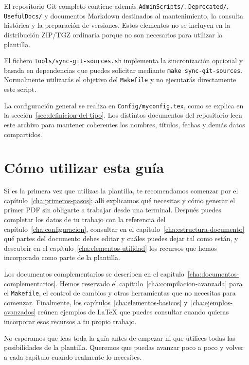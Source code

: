 El repositorio Git completo contiene además \texttt{AdminScripts/}, \texttt{Deprecated/}, \texttt{UsefulDocs/} y documentos Markdown destinados al mantenimiento, la consulta histórica y la preparación de versiones. Estos elementos no se incluyen en la distribución ZIP/TGZ ordinaria porque no son necesarios para utilizar la plantilla.

El fichero \texttt{Tools/sync-git-sources.sh} implementa la sincronización opcional y basada en dependencias que puedes solicitar mediante \texttt{make sync-git-sources}. Normalmente utilizarás el objetivo del \texttt{Makefile} y no ejecutarás directamente este script.

La configuración general se realiza en \texttt{Config/myconfig.tex}, como se explica en la sección~\ref{sec:definicion-del-tipo}. Los distintos documentos del repositorio leen este archivo para mantener coherentes los nombres, títulos, fechas y demás datos compartidos.



\section{Cómo utilizar esta guía}
\label{sec:itinerario-guia}

Si es la primera vez que utilizas la plantilla, te recomendamos comenzar por el capítulo~\ref{cha:primeros-pasos}: allí explicamos qué necesitas y cómo generar el primer PDF sin obligarte a trabajar desde una terminal. Después puedes completar los datos de tu trabajo con la referencia del capítulo~\ref{cha:configuracion}, consultar en el capítulo~\ref{cha:estructura-documento} qué partes del documento debes editar y cuáles puedes dejar tal como están, y descubrir en el capítulo~\ref{cha:elementos-utilidad} los recursos que hemos incorporado como parte de la plantilla.

Los documentos complementarios se describen en el capítulo~\ref{cha:documentos-complementarios}. Hemos reservado el capítulo~\ref{cha:compilacion-avanzada} para el \texttt{Makefile}, el control de cambios y otras herramientas que no necesitas para comenzar. Finalmente, los capítulos~\ref{cha:elementos-basicos} y~\ref{cha:ejemplos-avanzados} reúnen ejemplos de \LaTeX{} que puedes consultar cuando quieras incorporar esos recursos a tu propio trabajo.

No esperamos que leas toda la guía antes de empezar ni que utilices todas las posibilidades de la plantilla. Queremos que puedas avanzar poco a poco y volver a cada capítulo cuando realmente lo necesites.

